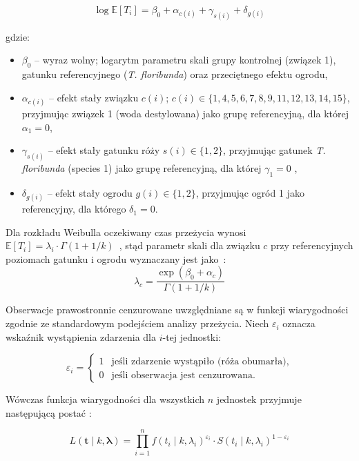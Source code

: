 \documentclass[12pt, a4paper]{article}
\begin{document}
\begin{equation}
    \log \mathbb{E}[T_i] = \beta_0 + \alpha_{c(i)} + \gamma_{s(i)} + \delta_{g(i)}
    \label{eq:linear_predictor}
\end{equation}

gdzie:
\begin{itemize}[noitemsep]
    \item $\beta_0$ -- wyraz wolny; logarytm parametru skali grupy kontrolnej (związek 1), gatunku referencyjnego (\textit{T. floribunda}) oraz przeciętnego efektu ogrodu,
    \item $\alpha_{c(i)}$ -- efekt stały związku $c(i)$; $c(i) \in \{1, 4, 5, 6, 7, 8, 9, 11, 12, 13, 14, 15\}$, przyjmując związek 1 (woda destylowana) jako grupę referencyjną, dla której $\alpha_1 = 0$,
    \item $\gamma_{s(i)}$ -- efekt stały gatunku róży $s(i) \in \{1, 2\}$, przyjmując gatunek \textit{T. floribunda} (species 1) jako grupę referencyjną, dla której $\gamma_1 = 0$ ,
    \item $\delta_{g(i)}$ -- efekt stały ogrodu $g(i) \in \{1, 2\}$, przyjmując ogród 1 jako referencyjny, dla którego $\delta_1 = 0$.
\end{itemize}

Dla rozkładu Weibulla oczekiwany czas przeżycia wynosi $\mathbb{E}[T_i] = \lambda_i \cdot \Gamma(1+1/k)$~\cite{stan_survival}, stąd parametr skali dla związku $c$ przy referencyjnych poziomach gatunku i ogrodu wyznaczany jest jako~\cite{brms_families}:
\[
    \lambda_c = \frac{\exp(\beta_0 + \alpha_c)}{\Gamma(1 + 1/k)}
\]

Obserwacje prawostronnie cenzurowane uwzględniane są w funkcji 
wiarygodności zgodnie ze standardowym podejściem analizy przeżycia.
Niech $\varepsilon_i$ oznacza wskaźnik wystąpienia zdarzenia dla $i$-tej jednostki:

\begin{equation}
    \varepsilon_i = \begin{cases}
        1 & \text{jeśli zdarzenie wystąpiło (róża obumarła),} \\
        0 & \text{jeśli obserwacja jest cenzurowana.}
    \end{cases}
\end{equation}

Wówczas funkcja wiarygodności dla wszystkich $n$ jednostek przyjmuje następującą postać \parencite{qian1994}:

\begin{equation}
    L(\mathbf{t} \mid k, \boldsymbol{\lambda}) =
    \prod_{i=1}^{n} f(t_i \mid k, \lambda_i)^{\varepsilon_i} \cdot
    S(t_i \mid k, \lambda_i)^{1-\varepsilon_i}
    \label{eq:likelihood}
\end{equation}
\end{document}
